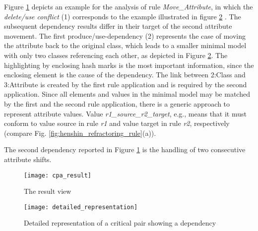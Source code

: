 Figure \ref{fig:cpa_result} depicts an example for the analysis of rule \emph{Move\_Attribute}, in which the\emph{ delete/use conﬂict} (1) corresponds to the example illustrated in figure \ref{fig:minimal_model} \cite{mens2007analysing}.
The subsequent dependency results diﬀer in their target of the second attribute movement. The ﬁrst produce/use-dependency (2) represents the case of moving the attribute back to the original class, which leads to a smaller minimal model with only two classes referencing each other, as depicted in Figure \ref{fig:minimal_model}. The highlighting by enclosing hash marks is the
most important information, since the enclosing element is the cause of the dependency. The link between 2:Class and 3:Attribute is created by the ﬁrst rule application and is required by the second application. Since all elements and values in the minimal model may be matched by the ﬁrst and the second rule application, there is a generic approach to represent attribute
values. Value \emph{r1\_source\_r2\_target}, e.g., means that it must conform to value source in rule \emph{r1} and value target in rule \emph{r2}, respectively (compare Fig. \ref{fig:henshin_refractoring_rule}(a)).

The second dependency reported in Figure \ref{fig:cpa_result} is the handling of two consecutive attribute shifts.

\begin{figure}
\center
\texttt{[image: cpa\_result]}
\caption{The result view\cite{born2015analyzing} }\label{fig:cpa_result}
\end{figure}
\begin{figure}
\center
\texttt{[image: detailed\_representation]}
\caption{Detailed representation of a critical pair showing a dependency \cite{born2015analyzing} }\label{fig:minimal_model}
\end{figure}

